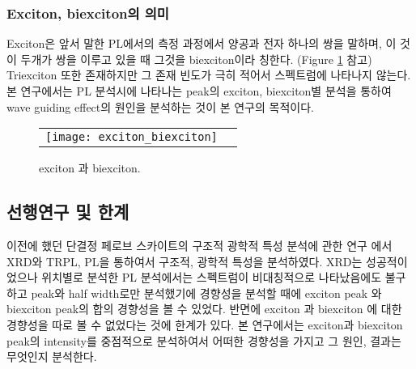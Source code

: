 \subsubsection{Exciton, biexciton의 의미}
Exciton은 앞서 말한 PL에서의 측정 과정에서 양공과 전자 하나의 쌍을 말하며, 이 것이 두개가 쌍을 이루고 있을 때 그것을 biexciton이라 칭한다. (Figure \ref{fig:ex} 참고) Triexciton 또한 존재하지만 그 존재 빈도가 극히 적어서 스펙트럼에 나타나지 않는다. 본 연구에서는 PL 분석시에 나타나는 peak의 exciton, biexciton별 분석을 통하여 wave guiding effect의 원인을 분석하는 것이 본 연구의 목적이다.
\begin{figure}[t]
	\begin{center}
		\begin{tabular}{cc}
			\texttt{[image: exciton\_biexciton]}
		\end{tabular}
	\end{center}
	\caption{exciton 과 biexciton.}
	\label{fig:ex}  
\end{figure}
\subsection{선행연구 및 한계}
이전에 했던 단결정 페로브 스카이트의 구조적 광학적 특성 분석에 관한 연구 에서 XRD와 TRPL, PL을 통하여서 구조적, 광학적 특성을 분석하였다. XRD는 성공적이었으나 위치별로 분석한 PL 분석에서는 스펙트럼이 비대칭적으로 나타났음에도 불구하고 peak와 half width로만 분석했기에 경향성을 분석할 때에 exciton peak 와 biexciton peak의 합의 경향성을 볼 수 있었다. 반면에 exciton 과 biexciton 에 대한 경향성을 따로 볼 수 없었다는 것에 한계가 있다. 본 연구에서는 exciton과 biexciton peak의 intensity를 중점적으로 분석하여서 어떠한 경향성을 가지고 그 원인, 결과는 무엇인지 분석한다.
